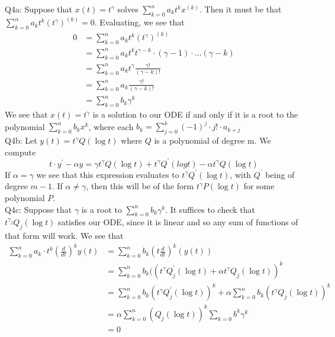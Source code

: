 \documentclass[letterpaper]{article}
\begin{document}
\noindent Q4a: Suppose that $x(t) = t^\gamma$ solves $\sum_{k=0}^n a_k t^k x^{(k)}$. Then it must be that $\sum_{k=0}^n a_k t^k (t^\gamma)^{(k)}=0$. Evaluating, we see that 
\begin{align*}
0 & = \sum_{k=0}^n a_k t^k (t^\gamma)^{(k)}
\\ & = \sum_{k=0}^n a_k t^k t^{\gamma-k}\cdot (\gamma-1)\cdot \dots (\gamma-k)
\\ & = \sum_{k=0}^n a_k t^\gamma \frac{\gamma!}{(\gamma-k)!}
\\ & = \sum_{k=0}^n a_k \frac{\gamma!}{(\gamma-k)!}
\\ & = \sum_{k=0}^n b_k \gamma^k \tag{for some $b_k$}
\end{align*} We see that $x(t) = t^\gamma$ is a solution to our ODE if and only if it is a root to the polynomial $\sum_{k=0}^n b_k x^k$, where each $b_k = \sum_{j=0}^k (-1)^{j}\cdot j! \cdot a_{k+j}$
\newline \\ Q4b: Let $y(t) = t^\gamma Q(\log t)$ where $Q$ is a polynomial of degree m. We compute 
$$t\cdot y^\prime - \alpha y = \gamma t^\gamma Q(\log t) + t^\gamma Q^\prime (log t) - \alpha t^\gamma Q(\log t)$$
If $\alpha = \gamma$ we see that this expression evaluates to $t^\gamma Q^\prime (\log t)$, with $Q^\prime$ being of degree $m-1$. If $\alpha \neq \gamma$, then this will be of the form $t^\gamma P(\log t)$ for some polynomial $P$. 
\newline \\ Q4c: Suppose that $\gamma$ is a root to $\sum_{k=0}^n b_k \gamma^k$. It suffices to check that $t^{\gamma_j}Q_j(\log t)$ satisfies our ODE, since it is linear and so any sum of functions of that form will work. We see that 
\begin{align*}
    \sum_{k=0}^n a_k \cdot t^k (\frac{d}{dt})^k y(t) & = \sum_{k=0}^n b_k (t\frac{d}{dt})^k (y(t))
    \\ & = \sum_{k=0}^n b_k ( (t^\gamma Q_j^\prime ( \log t) + \alpha t^\gamma Q_j ( \log t))^k \tag{by 4b}
    \\ & = \sum_{k=0}^n b_k (t^\gamma Q^\prime_j  (\log t))^k + \alpha \sum_{k=0}^n b_k (t^\gamma Q_j ( \log t))^k
    \\ & = \alpha \sum_{k=0}^n (Q_j(\log t))^k \sum_{k=0}b^k \gamma^k
    \\ & = 0
\end{align*}    
\end{document}
